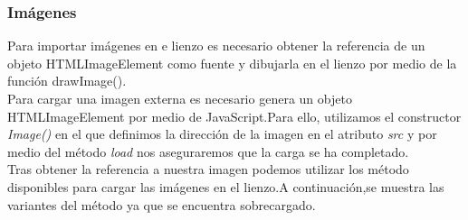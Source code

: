 \subsubsection*{Imágenes}
Para importar imágenes en e lienzo es necesario obtener la referencia de un objeto HTMLImageElement como fuente y dibujarla en el lienzo por medio de la función drawImage().  
\\Para cargar una imagen externa es necesario genera un objeto HTMLImageElement por medio de JavaScript.Para ello, utilizamos el constructor \textit{Image()} en el que definimos la dirección de la imagen en el atributo \textit{src} y por medio del método \textit{load} nos aseguraremos que la carga se ha completado.
\\Tras obtener la referencia a nuestra imagen podemos utilizar los método disponibles para cargar las imágenes en el lienzo.A continuación,se muestra las variantes del método ya que se encuentra sobrecargado. 
